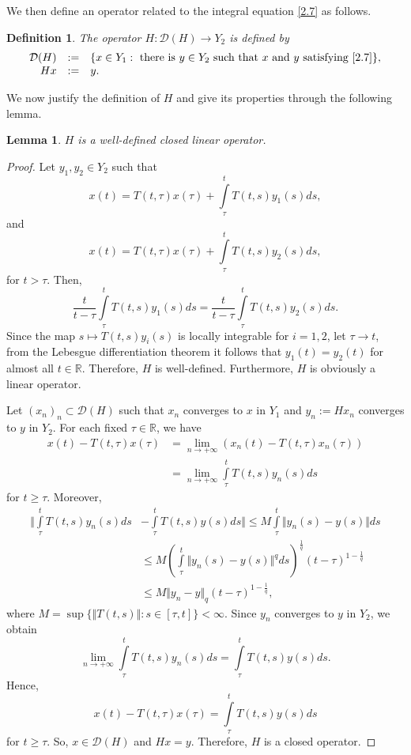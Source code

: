 \documentclass[reqno]{amsart}
\newtheorem{lemma}{Lemma}[section]
\newtheorem{definition}{Definition}[section]
\def\r{\mathbb{R}}
\begin{document}
We then define an operator related to the integral equation \eqref{2.7} as follows.
\begin{definition}\label{H}
The operator $H:\mathcal{D}(H) \to Y_2$ is defined by 
\begin{align*}
\begin{array}{rll}
\mathcal{D}(H)&:=&\{ x\in Y_1: \text{ there is } y \in Y_2 \text{ such that } x \text{ and } y \text { satisfying } \eqref{2.7}\},\\
Hx&:=&y.
\end{array}
\end{align*}
\end{definition}
We now justify the definition of $H$ and give its properties through the following lemma.
\begin{lemma} \label{lem2}
$H$ is a well-defined closed linear operator.
\end{lemma}
\begin{proof}
Let  $y_1,y_2 \in Y_2$ such that
 $$x(t)=T(t,\tau)x(\tau)+\displaystyle\int\limits_{\tau}^{t}T(t,s)y_1(s)ds,$$
 and
 $$x(t)=T(t,\tau)x(\tau)+\displaystyle\int\limits_{\tau}^{t}T(t,s)y_2(s)ds,$$
 for $t > \tau$. Then,
 $$\dfrac{t}{t-\tau}\displaystyle\int\limits_{\tau}^{t}T(t,s)y_1(s)ds=\frac{t}{t-\tau}\displaystyle\int\limits_{\tau}^{t}T(t,s)y_2(s)ds.$$
 Since the map  $s \mapsto T(t,s)y_i(s)$ is locally integrable for $i=1,2$, let $\tau \rightarrow t$, from the Lebesgue differentiation theorem it follows that $y_1(t)=y_2(t)$ for almost all $t \in \mathbb{R}$. Therefore, $H$ is well-defined. Furthermore, $H$ is obviously a linear operator.

Let $(x_n)_n \subset \mathcal{D}(H)$ such that $x_n $ converges to $x$ in $Y_1$ and $y_n:=Hx_n $ converges to $y$ in $Y_2$. 
For each fixed $\tau \in \r$, we have
 \begin{align*}
 x(t)-T(t,\tau)x(\tau)&= \lim_{n \rightarrow +\infty}\left( x_{n}(t)-T(t,\tau)x_{n}(\tau)\right)\\
 &= \lim_{n \rightarrow +\infty}\displaystyle\int\limits_{\tau}^{t}T(t,s)y_{n}(s)ds
 \end{align*}
 for $ t\geq \tau$. Moreover,
\begin{align*}
 \Big\Vert \displaystyle\int\limits_{\tau}^{t}T(t,s)y_{n}(s)ds&-\displaystyle\int\limits_{\tau}^{t}T(t,s)y(s)ds \Big\Vert \leq M \displaystyle\int\limits_{\tau}^{t}\Vert y_{n}(s)-y(s)\Vert ds\\
 &\leq M\left( \displaystyle\int\limits_{\tau}^{t}\Vert y_{n}(s)-y(s)\Vert ^q ds \right)^{\frac{1}{q}}(t-\tau)^{1-\frac{1}{q}}\\
 &\leq M
\Vert y_{n}-y \Vert _q (t-\tau)^{1-\frac{1}{q}},
\end{align*} 
where $M=\sup \{\Vert T(t,s)\Vert : s \in [\tau,t]\}< \infty$. Since $y_{n}$ converges to $y$ in $Y_2$, we obtain 
 $$ \displaystyle \lim_{n \rightarrow +\infty}\displaystyle\int\limits_{\tau}^{t}T(t,s)y_{n}(s)ds=\displaystyle\int\limits_{\tau}^{t}T(t,s)y(s)ds.$$ 
 Hence,
 $$x(t)-T(t,\tau)x(\tau)=\displaystyle\int\limits_{\tau}^{t}T(t,s)y(s)ds $$
for $t\geq \tau$. So, $x \in \mathcal{D}(H)$ and $Hx=y$. Therefore, $H$ is a closed operator.
\end{proof}
\end{document}
